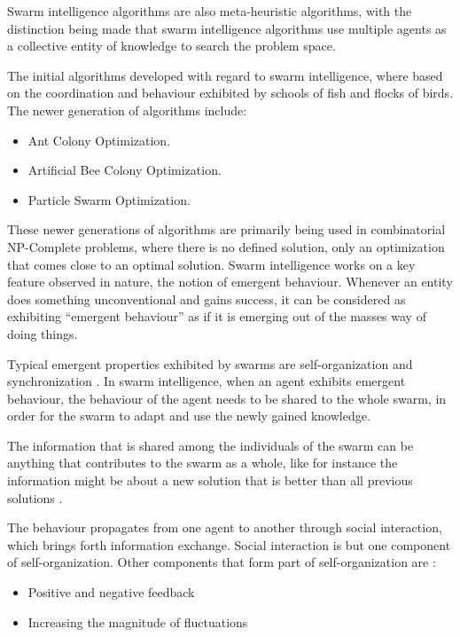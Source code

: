 Swarm intelligence algorithms are also meta-heuristic algorithms, with the distinction being made that swarm intelligence algorithms use multiple agents as a collective entity of knowledge to search the problem space\cite{SwarmArt,ChaoticSwarmIntel,BeeJobShop,CompuIntelligenceIntro,FundamentalSwarm}.

The initial algorithms developed with regard to swarm intelligence, where based on the coordination and behaviour exhibited by schools of fish and flocks of birds. The newer generation of algorithms include\cite{SwarmArt,ChaoticSwarmIntel,BeeJobShop}:
\begin{itemize}
\item Ant Colony Optimization\cite{SwarmArt}.
\item Artificial Bee Colony Optimization\cite{BeeJobShop}.
\item Particle Swarm Optimization\cite{ChaoticSwarmIntel}. 
\end{itemize}

These newer generations of algorithms are primarily being used in combinatorial NP-Complete problems, where there is no defined solution, only an optimization that comes close to an optimal solution. Swarm intelligence works on a key feature observed in nature, the notion of emergent behaviour\cite{SwarmArt,CompuIntelligenceIntro,FundamentalSwarm}. Whenever an entity does something unconventional and gains success, it can be considered as exhibiting “emergent behaviour” as if it is emerging out of the masses way of doing things\cite{SwarmArt,CompuIntelligenceIntro,FundamentalSwarm}. 

Typical emergent properties exhibited by swarms are self-organization and synchronization \cite{SwarmArt}. In swarm intelligence, when an agent exhibits emergent behaviour, the behaviour of the agent needs to be shared to the whole swarm, in order for the swarm to adapt and use the newly gained knowledge\cite{SwarmArt,ChaoticSwarmIntel,CompuIntelligenceIntro,FundamentalSwarm}.

The information that is shared among the individuals of the swarm can be anything that contributes to the swarm as a whole, like for instance the information might be about a new solution that is better than all previous solutions \cite{SwarmArt,ChaoticSwarmIntel,CompuIntelligenceIntro,FundamentalSwarm}. 

The behaviour propagates from one agent to another through social interaction, which brings forth information exchange\cite{SwarmArt}. Social interaction is but one component of self-organization. Other components that form part of self-organization are \cite{SwarmArt}:
\begin{itemize}
\item Positive and negative feedback
\item Increasing the magnitude of fluctuations
\end{itemize}

